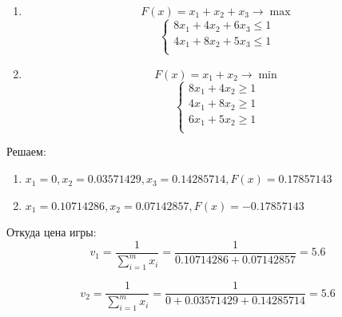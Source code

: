 \documentclass[9pt, a4paper]{article}
\begin{document}
    \begin{enumerate}
        \item
        \begin{equation}
            F(x) = x_1 + x_2 + x_3 \rightarrow \max\label{eq:equation27}
        \end{equation}
        \begin{equation}
            \begin{cases}
                8x_1 + 4x_2 + 6x_3 \leqslant 1\\
                4x_1 + 8x_2 + 5x_3 \leqslant 1\\
            \end{cases}\label{eq:equation28}
        \end{equation}

        \item
        \begin{equation}
            F(x) = x_1 + x_2 \rightarrow \min\label{eq:equation29}
        \end{equation}
        \begin{equation}
            \begin{cases}
                8x_1 + 4x_2 \geqslant 1\\
                4x_1 + 8x_2 \geqslant 1\\
                6x_1 + 5x_2 \geqslant 1\\
            \end{cases}\label{eq:equation30}
        \end{equation}
    \end{enumerate}

    Решаем:
    \begin{enumerate}
        \item $x_1 = 0, x_2 = 0.03571429, x_3 = 0.14285714, F(x) = 0.17857143$
        \item $x_1 = 0.10714286, x_2 = 0.07142857, F(x) = -0.17857143$
    \end{enumerate}

    Откуда цена игры:
    \begin{equation}
        v_1 = \frac{1}{\sum_{i=1}^m x_i} = \frac{1}{0.10714286 + 0.07142857} = 5.6\label{eq:equation31}
    \end{equation}

    \begin{equation}
        v_2 = \frac{1}{\sum_{i=1}^m x_i} = \frac{1}{0 + 0.03571429 + 0.14285714} = 5.6\label{eq:equation32}
    \end{equation}
\end{document}
